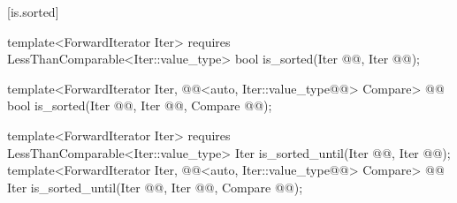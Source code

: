 \documentclass[american,twoside]{book}
\begin{document}
\begin{paras}
[is.sorted]{}

%
\color{addclr}
\begin{itemdecl}
template<ForwardIterator Iter>
  requires LessThanComparable<Iter::value_type>
  bool is_sorted(Iter @@, Iter @@);
\end{itemdecl}
\color{black}

\begin{itemdescr}
\pnum
{}
\end{itemdescr}

%
\color{addclr}
\begin{itemdecl}
template<ForwardIterator Iter, 
         @@<auto, Iter::value_type@@> Compare>
  @@
  bool is_sorted(Iter @@, Iter @@,
                 Compare @@);
\end{itemdecl}
\color{black}

\begin{itemdescr}
\pnum
{}
\end{itemdescr}

%
\color{addclr}
\begin{itemdecl}
template<ForwardIterator Iter>
  requires LessThanComparable<Iter::value_type>
  Iter is_sorted_until(Iter @@, Iter @@);
template<ForwardIterator Iter, 
         @@<auto, Iter::value_type@@> Compare>
  @@
  Iter is_sorted_until(Iter @@, Iter @@,
                       Compare @@);
\end{itemdecl}
\color{black}

\begin{itemdescr}
\pnum
{}

\pnum
{}
\end{itemdescr}


\end{paras}
\end{document}
